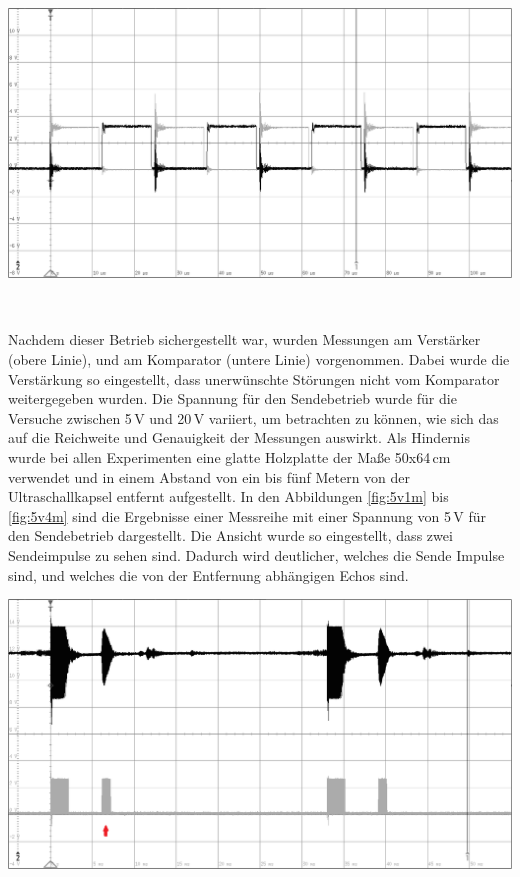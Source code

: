 \begin{center}
\begin{minipage}{0.75\textwidth}
\includegraphics[width=1\textwidth%
]{Abbildungen/MessungenP2/Zwei_PWMs_von_der_CPU.PNG}
\label{fig:PWMs}
\end{minipage}\\
\end{center}
Nachdem dieser Betrieb sichergestellt war, wurden Messungen am Verstärker (obere Linie), und am Komparator (untere Linie) vorgenommen. Dabei wurde die Verstärkung so eingestellt, dass unerwünschte Störungen nicht vom Komparator weitergegeben wurden. Die Spannung für den Sendebetrieb wurde für die Versuche zwischen 5\,V und 20\,V variiert, um betrachten zu können, wie sich das auf die Reichweite und Genauigkeit der Messungen auswirkt. Als Hindernis wurde bei allen Experimenten eine glatte Holzplatte der Maße 50x64\,cm verwendet und in einem Abstand von ein bis fünf Metern von der Ultraschallkapsel entfernt aufgestellt. In den Abbildungen \ref{fig:5v1m} bis \ref{fig:5v4m} sind die Ergebnisse einer Messreihe mit einer Spannung von 5\,V für den Sendebetrieb dargestellt. Die Ansicht wurde so eingestellt, dass zwei Sendeimpulse zu sehen sind. Dadurch wird deutlicher, welches die Sende Impulse sind, und welches die von der Entfernung abhängigen Echos sind.\\
\begin{minipage}{0.46\textwidth}
\includegraphics[width=1\textwidth%
]{Abbildungen/MessungenP2/5V/1mb.PNG}
\label{fig:5v1m}
\end{minipage}\qquad
